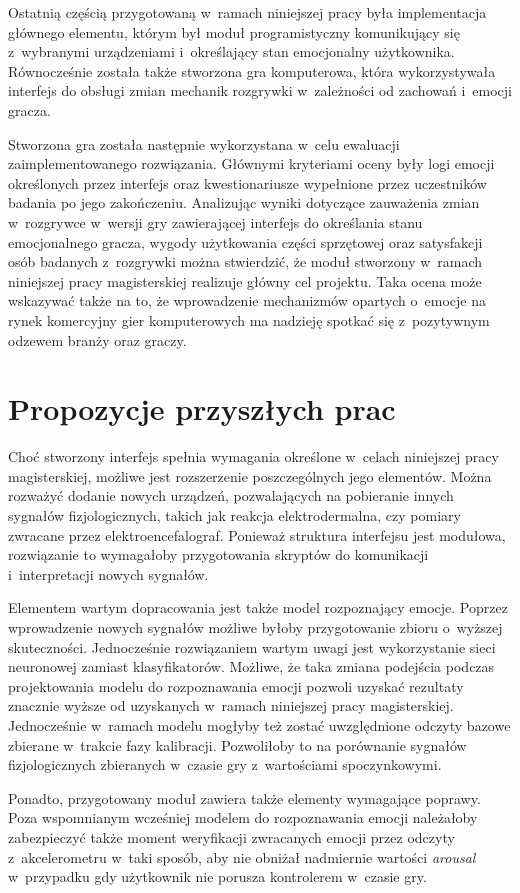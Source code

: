 Ostatnią częścią przygotowaną w~ramach niniejszej pracy była implementacja głównego elementu, którym był moduł programistyczny komunikujący się z~wybranymi urządzeniami i~określający stan emocjonalny użytkownika. Równocześnie została także stworzona gra komputerowa, która wykorzystywała interfejs do obsługi zmian mechanik rozgrywki w~zależności od zachowań i~emocji gracza. 

Stworzona gra została następnie wykorzystana w~celu ewaluacji zaimplementowanego rozwiązania. Głównymi kryteriami oceny były logi emocji określonych przez interfejs oraz kwestionariusze wypełnione przez uczestników badania po jego zakończeniu. Analizując wyniki dotyczące zauważenia zmian w~rozgrywce w~wersji gry zawierającej interfejs do określania stanu emocjonalnego gracza, wygody użytkowania części sprzętowej oraz satysfakcji osób badanych z~rozgrywki można stwierdzić, że moduł stworzony w~ramach niniejszej pracy magisterskiej realizuje główny cel projektu. Taka ocena może wskazywać także na to, że wprowadzenie mechanizmów opartych o~emocje na rynek komercyjny gier komputerowych ma nadzieję spotkać się z~pozytywnym odzewem branży oraz graczy.

\section{Propozycje przyszłych prac}
Choć stworzony interfejs spełnia wymagania określone w~celach niniejszej pracy magisterskiej, możliwe jest rozszerzenie poszczególnych jego elementów. Można rozważyć dodanie nowych urządzeń, pozwalających na pobieranie innych sygnałów fizjologicznych, takich jak reakcja elektrodermalna, czy pomiary zwracane przez elektroencefalograf. Ponieważ struktura interfejsu jest modułowa, rozwiązanie to wymagałoby przygotowania skryptów do komunikacji i~interpretacji nowych sygnałów. 

Elementem wartym dopracowania jest także model rozpoznający emocje. Poprzez wprowadzenie nowych sygnałów możliwe byłoby przygotowanie zbioru o~wyższej skuteczności. Jednocześnie rozwiązaniem wartym uwagi jest wykorzystanie sieci neuronowej zamiast klasyfikatorów. Możliwe, że taka zmiana podejścia podczas projektowania modelu do rozpoznawania emocji pozwoli uzyskać rezultaty znacznie wyższe od uzyskanych w~ramach niniejszej pracy magisterskiej. Jednocześnie w~ramach modelu mogłyby też zostać uwzględnione odczyty bazowe zbierane w~trakcie fazy kalibracji. Pozwoliłoby to na porównanie sygnałów fizjologicznych zbieranych w~czasie gry z~wartościami spoczynkowymi. 

Ponadto, przygotowany moduł zawiera także elementy wymagające poprawy. Poza wspomnianym wcześniej modelem do rozpoznawania emocji należałoby zabezpieczyć także moment weryfikacji zwracanych emocji przez odczyty z~akcelerometru w~taki sposób, aby nie obniżał nadmiernie wartości \textit{arousal} w~przypadku gdy użytkownik nie porusza kontrolerem w~czasie gry.


